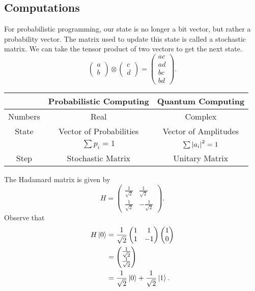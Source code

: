 \documentclass[class=article, crop=false]{standalone}
\begin{document}
  \subsection{Computations}
  For probabilistic programming, our state is no longer a bit vector, but rather a probability vector. The matrix used to update this state is called a stochastic matrix. We can take the tensor product of two vectors to get the next state.
  \[
    \begin{pmatrix}
      a \\
      b
    \end{pmatrix}\otimes \begin{pmatrix}
      c \\
      d
    \end{pmatrix} = \begin{pmatrix}
      ac \\
      ad \\
      bc \\
      bd
    \end{pmatrix}.
  \]
  \begin{center}
    \begin{tabular}{c|c|c}
      & Probabilistic Computing & Quantum Computing \\
      \hline
      Numbers & Real & Complex \\
      \hline
      State & Vector of Probabilities & Vector of Amplitudes  \\
            & $\sum p_i = 1$ & $\sum \left\lvert a_i \right\rvert^2 = 1$ \\
      \hline
      Step & Stochastic Matrix & Unitary Matrix
    \end{tabular}
  \end{center}
  The Hadamard matrix is given by
  \[
    H = \begin{pmatrix}
      \frac{1}{\sqrt{2}} & \frac{1}{\sqrt{2}} \\
      \frac{1}{\sqrt{2}} & -\frac{1}{\sqrt{2}}
    \end{pmatrix}.
  \]
  Observe that
  \begin{align*}
    H\left\lvert 0 \right\rangle &= \frac{1}{\sqrt{2}}\begin{pmatrix}
      1 & 1 \\
      1 & -1
    \end{pmatrix}\begin{pmatrix}
      1 \\
      0
    \end{pmatrix} \\
             &= \begin{pmatrix}
              \frac{1}{\sqrt{2}} \\
              \frac{1}{\sqrt{2}}
             \end{pmatrix} \\
             &= \frac{1}{\sqrt{2}}\left\lvert 0 \right\rangle + \frac{1}{\sqrt{2}}\left\lvert 1 \right\rangle.
  \end{align*}
\end{document}
